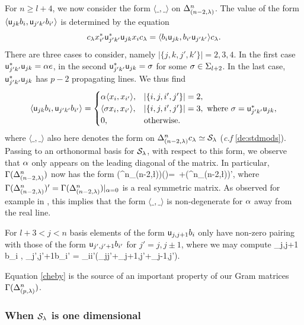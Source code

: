\mdef \label{pa:gramrels}
For $n\geq l+4$, we now consider the form $\langle\_,\_\rangle$ on $\Delta^{n}_{(n-2,\lambda)}$. The value of the form $\langle {\mathsf u}_{jk} b_i , {\mathsf u}_{j'k'} b_{i'} \rangle$ is determined by the equation
 \[
 c_{\lambda }   x_{i'}^* {\mathsf u}_{j'k'}^* {\mathsf u}_{jk} x_i  c_{\lambda}= \langle b_i {\mathsf u}_{jk}, b_{i'} {\mathsf u}_{j'k'} \rangle c_{\lambda}.
\]
There are three cases to consider, namely $|\{j,k,j',k'\}|=2,3,4$. In the first case $ {\mathsf u}_{j'k'}^*{\mathsf u}_{jk}=\alpha e$, in the second ${\mathsf u}_{j'k'}^* {\mathsf u}_{jk} =\sigma$ for some $\sigma\in \Sigma_{l+2}$. In the last case,  ${\mathsf u}_{j'k'}^* {\mathsf u}_{jk} $ has $p-2$ propagating lines. We thus find
\[ \langle  {\mathsf u}_{jk} b_i ,{\mathsf u}_{j'k'} b_{i'}  \rangle =\begin{cases}
    \alpha \langle x_i, x_{i'}\rangle, & |\{i,j,i',j'\}|=2,\\
    \langle \sigma x_i, x_{i'}\rangle, & |\{i,j,i',j'\}|=3, \text{ where } \sigma={\mathsf u}_{j'k'}^*{\mathsf u}_{jk} ,\\
    0, & \text{otherwise.}
\end{cases} 
\]
where $\langle\_,\_\rangle$ also here denotes the form on $\Delta^{n}_{(n-2,\lambda)} c_{\lambda} \simeq \mathcal{S}_\lambda$ (\textit{c.f} \ref{de:stdmods}). Passing to an orthonormal basis for $\mathcal{S}_\lambda$, with respect to this form, we observe that $\alpha$ only appears on the leading diagonal of the matrix. In particular, $\Gamma(\Delta^{n}_{(n-2,\lambda)})$ now has the form
\beq \Gamma(\Delta^{n}_{(n-2,\l)})(\a)=\a \,  +\Gamma(\Delta^{n}_{(n-2,\l)})', \label{eq:adep} \eq
where $\Gamma(\Delta^{n}_{(n-2,\lambda)})'=\Gamma(\Delta^{n}_{(n-2,\lambda)})|_{\alpha=0}$ is a real symmetric matrix. As observed for example in \cite{KY2}, this implies that the form $\langle \_ , \_\rangle$ is non-degenerate for $\alpha$ away from the real line.

For $l+3<j<n$ basis elements of the form ${\mathsf u}_{j,j+1} b_i $ 
only have non-zero pairing with those of the form ${\mathsf u}_{j',j'+1} b_{i'}$ for $j'=j,j\pm 1$, where we may compute
\beq \langle \uu_{j,j+1} b_i  , \uu_{j',j'+1}b_{i'} \rangle = \delta_{ii'}(\a \delta_{jj'}+\delta_{j+1,j'}+\delta_{j-1,j'}). \label{cheby} \eq

Equation \eqref{cheby} is the source of an important property of our Gram matrices $\Gamma(\Delta^{n}_{(p,\lambda)})$. 

\subsubsection{When $\mathcal{S}_\lambda$ is one dimensional}\label{ss:1dspecht}

